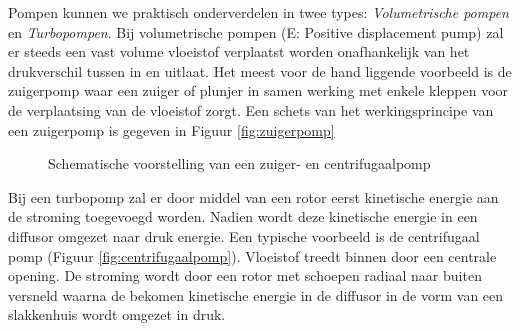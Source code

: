 Pompen kunnen we praktisch onderverdelen in twee types: \emph{Volumetrische pompen} en \emph{Turbopompen}. Bij volumetrische pompen (E: Positive displacement pump) zal er steeds een vast volume vloeistof verplaatst worden onafhankelijk van het drukverschil tussen in en uitlaat. Het meest voor de hand liggende voorbeeld is de zuigerpomp waar een zuiger of plunjer in samen werking met enkele kleppen voor de verplaatsing van de vloeistof zorgt. Een schets van het werkingsprincipe van een zuigerpomp is gegeven in Figuur \ref{fig:zuigerpomp} 
\begin{figure}
	\centering
	 \quad
	\caption{Schematische voorstelling van een zuiger- en centrifugaalpomp}
	\label{fig:pompen}
\end{figure}

Bij een turbopomp zal er door middel van een rotor eerst kinetische energie aan de stroming toegevoegd worden. Nadien wordt deze kinetische energie in een diffusor omgezet naar druk energie. Een typische voorbeeld is de centrifugaal pomp (Figuur \ref{fig:centrifugaalpomp}). Vloeistof treedt binnen door een centrale opening. De stroming wordt door een rotor met schoepen radiaal naar buiten versneld waarna de bekomen kinetische energie in de diffusor in de vorm van een slakkenhuis wordt omgezet in druk.

